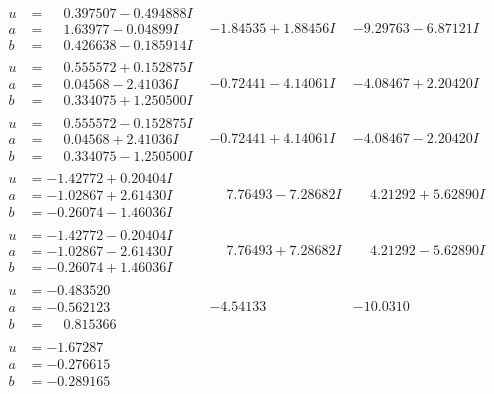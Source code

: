 \documentclass[1p]{elsarticle_modified}
\theoremstyle{definition}
\begin{document}
$$\begin{array}{c|c|c}
\begin{aligned}
u &= \phantom{-}0.397507 - 0.494888 I \\
a &= \phantom{-}1.63977 - 0.04899 I \\
b &= \phantom{-}0.426638 - 0.185914 I\end{aligned}
 & -1.84535 + 1.88456 I & -9.29763 - 6.87121 I \\ \hline\begin{aligned}
u &= \phantom{-}0.555572 + 0.152875 I \\
a &= \phantom{-}0.04568 - 2.41036 I \\
b &= \phantom{-}0.334075 + 1.250500 I\end{aligned}
 & -0.72441 - 4.14061 I & -4.08467 + 2.20420 I \\ \hline\begin{aligned}
u &= \phantom{-}0.555572 - 0.152875 I \\
a &= \phantom{-}0.04568 + 2.41036 I \\
b &= \phantom{-}0.334075 - 1.250500 I\end{aligned}
 & -0.72441 + 4.14061 I & -4.08467 - 2.20420 I \\ \hline\begin{aligned}
u &= -1.42772 + 0.20404 I \\
a &= -1.02867 + 2.61430 I \\
b &= -0.26074 - 1.46036 I\end{aligned}
 & \phantom{-}7.76493 - 7.28682 I & \phantom{-}4.21292 + 5.62890 I \\ \hline\begin{aligned}
u &= -1.42772 - 0.20404 I \\
a &= -1.02867 - 2.61430 I \\
b &= -0.26074 + 1.46036 I\end{aligned}
 & \phantom{-}7.76493 + 7.28682 I & \phantom{-}4.21292 - 5.62890 I \\ \hline\begin{aligned}
u &= -0.483520\phantom{ +0.000000I} \\
a &= -0.562123\phantom{ +0.000000I} \\
b &= \phantom{-}0.815366\phantom{ +0.000000I}\end{aligned}
 & -4.54133\phantom{ +0.000000I} & -10.0310\phantom{ +0.000000I} \\ \hline\begin{aligned}
u &= -1.67287\phantom{ +0.000000I} \\
a &= -0.276615\phantom{ +0.000000I} \\
b &= -0.289165\phantom{ +0.000000I}\end{aligned}

\end{array}$$
\end{document}
